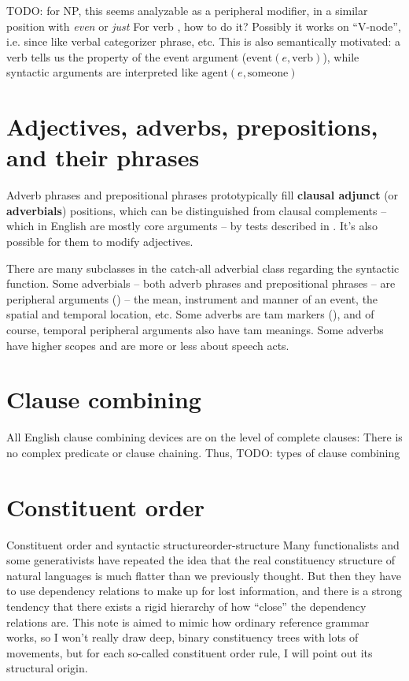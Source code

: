 \documentclass[UTF8, a4paper, oneside, scheme=plain]{ctexrep}
\newcommand*{\citesec}[1]{\S~{#1}}
\newcommand*{\citechap}[1]{Ch~{#1}}
\newcommand*{\citepage}[1]{p.~{#1}}
\newcommand*{\citechapsec}[2]{\citechap{#1}.\citesec{#2}}
\newcommand*{\concept}[1]{\textbf{#1}}
\newcommand{\corpus}[1]{\emph{#1}}
\begin{document}
TODO: for NP, this seems analyzable as a peripheral modifier,
in a similar position with \corpus{even} or \corpus{just}
For verb \cite[\citepage{125}]{kahnemuyipour2009syntax}, how to do it?
Possibly it works on ``V-node'', i.e. since like verbal categorizer phrase, etc.
This is also semantically motivated:
a verb tells us the property of the event argument ($\text{event}(e, \text{verb})$),
while syntactic arguments are interpreted like $\text{agent}(e, \text{someone})$

\section{Adjectives, adverbs, prepositions, and their phrases}

Adverb phrases and prepositional phrases 
prototypically fill \concept{clausal adjunct} (or \concept{adverbials}) positions, 
which can be distinguished from clausal complements -- which in English are mostly core arguments
-- by tests described in \citet[\citechapsec{4}{1.2}]{cgel}.
It's also possible for them to modify adjectives.

There are many subclasses in the catch-all adverbial class
regarding the syntactic function.
Some adverbials -- both adverb phrases and prepositional phrases -- 
are peripheral arguments () -- 
the mean, instrument and manner of an event,
the spatial and temporal location, etc. 
Some adverbs are \acs{tam} markers (),
and of course, temporal peripheral arguments also have \acs{tam} meanings.
Some adverbs have higher scopes and are more or less about speech acts.

\section{Clause combining}\label{sec:clause-combining}

All English clause combining devices are on the level of complete clauses:
There is no complex predicate or clause chaining.
Thus, TODO: types of clause combining

\section{Constituent order}\label{sec:overview.constituent-order}

\begin{theorybox}{Constituent order and syntactic structure}{order-structure}
    Many functionalists and some generativists have repeated the idea that 
    the real constituency structure of natural languages 
    is much flatter than we previously thought.
    But then they have to use dependency relations to make up for lost information,
    and there is a strong tendency that 
    there exists a rigid hierarchy of how ``close'' the dependency relations are.
    This note is aimed to mimic how ordinary reference grammar works,
    so I won't really draw deep, binary constituency trees with lots of movements,
    but for each so-called constituent order rule,
    I will point out its structural origin.
\end{theorybox}
\end{document}
